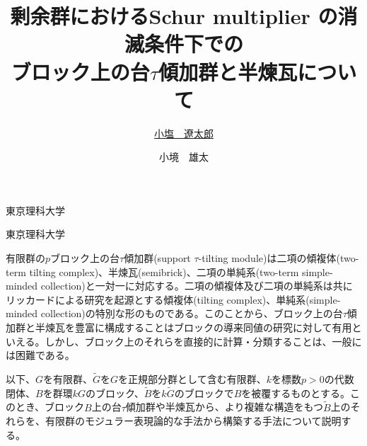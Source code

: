\documentclass[dvipdfmx]{msjproc}
\theoremstyle{definition}
\begin{document}
\title{
	剰余群におけるSchur multiplier の消滅条件下での\\ブロック上の台\(\tau\)傾加群と半煉瓦について
}



\author{\underline{小塩　遼太郎}}{東京理科大学}
\address{〒162-8601 東京都新宿区神楽坂1-3 東京理科大学大学院理学研究科数学専攻}

\author{小境　雄太}{東京理科大学}
\address{〒162-8601 東京都新宿区神楽坂1-3 東京理科大学理学部第一部数学科}




\maketitle
有限群の\(p\)ブロック上の台\(\tau\)傾加群(support \(\tau\)-tilting module)は二項の傾複体(two-term tilting complex)、半煉瓦(semibrick)、二項の単純系(two-term simple-minded collection)と一対一に対応する\cite{MR3187626,MR4139031}。二項の傾複体及び二項の単純系は共にリッカードによる研究を起源とする傾複体(tilting complex)、単純系(simple-minded collection)の特別な形のものである\cite{MR1002456,MR1947972}。このことから、ブロック上の台\(\tau\)傾加群と半煉瓦を豊富に構成することはブロックの導来同値の研究に対して有用といえる。しかし、ブロック上のそれらを直接的に計算・分類することは、一般には困難である。

以下、\(G\)を有限群、\(\tilde{G}\)を\(G\)を正規部分群として含む有限群、\(k\)を標数\(p>0\)の代数閉体、\(B\)を群環\(kG\)のブロック、\(\tilde{B}\)を\(k\tilde{G}\)のブロックで\(B\)を被覆するものとする。このとき、ブロック\(B\)上の台\(\tau\)傾加群や半煉瓦から、より複雑な構造をもつ\(\tilde{B}\)上のそれらを、有限群のモジュラー表現論的な手法から構築する手法について説明する。
\end{document}
